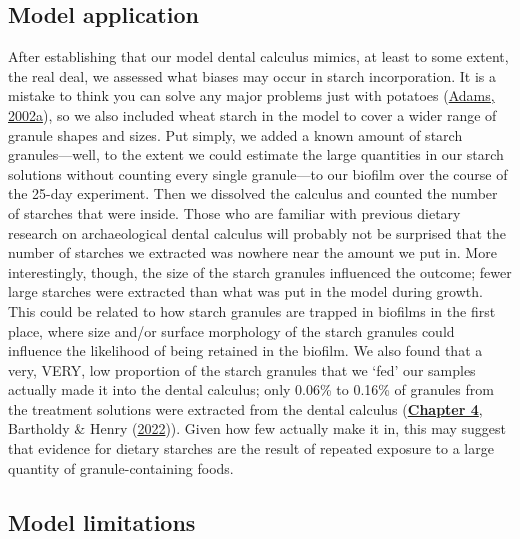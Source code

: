 \documentclass[
  letterpaper,
]{book}
\begin{document}
\hypertarget{model-application}{%
\subsection{Model application}\label{model-application}}

After establishing that our model dental calculus mimics, at least to
some extent, the real deal, we assessed what biases may occur in starch
incorporation. It is a mistake to think you can solve any major problems
just with potatoes (\protect\hyperlink{ref-adamsLifeUniverse2002}{Adams,
2002a}), so we also included wheat starch in the model to cover a wider
range of granule shapes and sizes. Put simply, we added a known amount
of starch granules---well, to the extent we could estimate the large
quantities in our starch solutions without counting every single
granule---to our biofilm over the course of the 25-day experiment. Then
we dissolved the calculus and counted the number of starches that were
inside. Those who are familiar with previous dietary research on
archaeological dental calculus will probably not be surprised that the
number of starches we extracted was nowhere near the amount we put in.
More interestingly, though, the size of the starch granules influenced
the outcome; fewer large starches were extracted than what was put in
the model during growth. This could be related to how starch granules
are trapped in biofilms in the first place, where size and/or surface
morphology of the starch granules could influence the likelihood of
being retained in the biofilm. We also found that a very, VERY, low
proportion of the starch granules that we `fed' our samples actually
made it into the dental calculus; only 0.06\% to 0.16\% of granules from
the treatment solutions were extracted from the dental calculus
(\protect\hyperlink{byoc-starch}{\textbf{Chapter 4}}, Bartholdy \& Henry
(\protect\hyperlink{ref-bartholdyInvestigatingBiases2022}{2022})). Given
how few actually make it in, this may suggest that evidence for dietary
starches are the result of repeated exposure to a large quantity of
granule-containing foods.

\hypertarget{disc-model-limitations}{%
\subsection{Model limitations}\label{disc-model-limitations}}
\end{document}
